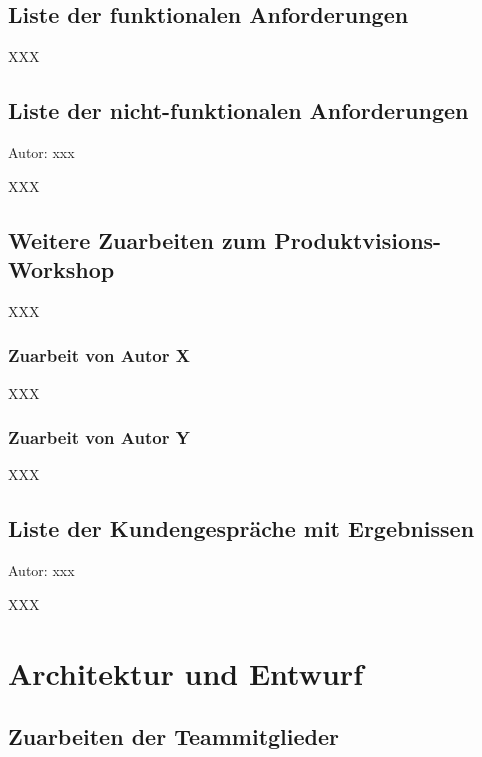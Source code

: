 \documentclass[twoside]{report}
\begin{document}


\subsection{Liste der funktionalen Anforderungen}

XXX

%
%
% 

\subsection{Liste der nicht-funktionalen Anforderungen}
{\small Autor: xxx}

XXX

\subsection{Weitere Zuarbeiten zum Produktvisions-Workshop}

XXX

\subsubsection{Zuarbeit von Autor X}
XXX
\subsubsection{Zuarbeit von Autor Y}
XXX

\subsection{Liste der Kundengespräche mit Ergebnissen}
{\small Autor: xxx}

XXX



\section{Architektur und Entwurf}

\subsection{Zuarbeiten der Teammitglieder}
\end{document}

